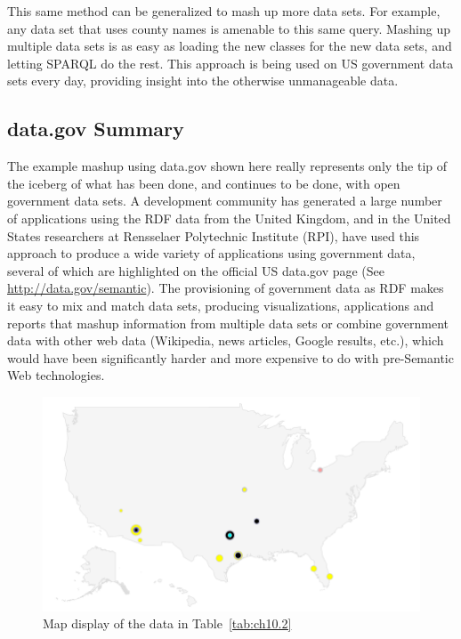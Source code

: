 This same method can be generalized to mash up more data sets. For
example, any data set that uses county names is amenable to this same
query. Mashing up multiple data sets is as easy as loading the new
classes for the new data sets, and letting SPARQL do the rest. This
approach is being used on US government data sets every day, providing
insight into the otherwise unmanageable data.

\subsection{data.gov Summary}

The example mashup using data.gov shown here really represents only the
tip of the iceberg of what has been done, and continues to be done, with
open government data sets. A development community has generated a large
number of applications using the RDF data from the United Kingdom, and
in the United States researchers at Rensselaer Polytechnic Institute
(RPI), have used this approach to produce a wide variety of applications
using government data, several of which are highlighted on the official
US data.gov page (See \url{http://data.gov/semantic}). The provisioning
of government data as RDF makes it easy to mix and match data sets,
producing visualizations, applications and reports that mashup
information from multiple data sets or combine government data with
other web data (Wikipedia, news articles, Google results, etc.), which
would have been significantly harder and more expensive to do with
pre-Semantic Web technologies.

\begin{figure}
\centering
\includegraphics[width=5in]{SWWOv3/media/ch10/figure10-5.png}
\caption{Map display of the data in Table~\ref{tab:ch10.2}}
\label{fig:ch10.2}
\end{figure}


